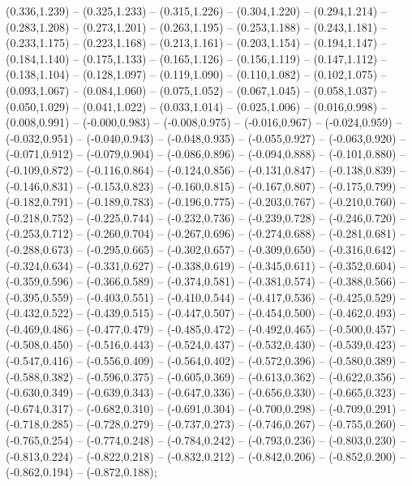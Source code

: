 (0.336,1.239) -- (0.325,1.233) -- (0.315,1.226) -- (0.304,1.220) -- (0.294,1.214) -- (0.283,1.208) -- (0.273,1.201) -- (0.263,1.195) -- (0.253,1.188) -- (0.243,1.181) -- (0.233,1.175) -- (0.223,1.168) -- (0.213,1.161) -- (0.203,1.154) -- (0.194,1.147) -- (0.184,1.140) -- (0.175,1.133) -- (0.165,1.126) -- (0.156,1.119) -- (0.147,1.112) -- (0.138,1.104) -- (0.128,1.097) -- (0.119,1.090) -- (0.110,1.082) -- (0.102,1.075) -- (0.093,1.067) -- (0.084,1.060) -- (0.075,1.052) -- (0.067,1.045) -- (0.058,1.037) -- (0.050,1.029) -- (0.041,1.022) -- (0.033,1.014) -- (0.025,1.006) -- (0.016,0.998) -- (0.008,0.991) -- (-0.000,0.983) -- (-0.008,0.975) -- (-0.016,0.967) -- (-0.024,0.959) -- (-0.032,0.951) -- (-0.040,0.943) -- (-0.048,0.935) -- (-0.055,0.927) -- (-0.063,0.920) -- (-0.071,0.912) -- (-0.079,0.904) -- (-0.086,0.896) -- (-0.094,0.888) -- (-0.101,0.880) -- (-0.109,0.872) -- (-0.116,0.864) -- (-0.124,0.856) -- (-0.131,0.847) -- (-0.138,0.839) -- (-0.146,0.831) -- (-0.153,0.823) -- (-0.160,0.815) -- (-0.167,0.807) -- (-0.175,0.799) -- (-0.182,0.791) -- (-0.189,0.783) -- (-0.196,0.775) -- (-0.203,0.767) -- (-0.210,0.760) -- (-0.218,0.752) -- (-0.225,0.744) -- (-0.232,0.736) -- (-0.239,0.728) -- (-0.246,0.720) -- (-0.253,0.712) -- (-0.260,0.704) -- (-0.267,0.696) -- (-0.274,0.688) -- (-0.281,0.681) -- (-0.288,0.673) -- (-0.295,0.665) -- (-0.302,0.657) -- (-0.309,0.650) -- (-0.316,0.642) -- (-0.324,0.634) -- (-0.331,0.627) -- (-0.338,0.619) -- (-0.345,0.611) -- (-0.352,0.604) -- (-0.359,0.596) -- (-0.366,0.589) -- (-0.374,0.581) -- (-0.381,0.574) -- (-0.388,0.566) -- (-0.395,0.559) -- (-0.403,0.551) -- (-0.410,0.544) -- (-0.417,0.536) -- (-0.425,0.529) -- (-0.432,0.522) -- (-0.439,0.515) -- (-0.447,0.507) -- (-0.454,0.500) -- (-0.462,0.493) -- (-0.469,0.486) -- (-0.477,0.479) -- (-0.485,0.472) -- (-0.492,0.465) -- (-0.500,0.457) -- (-0.508,0.450) -- (-0.516,0.443) -- (-0.524,0.437) -- (-0.532,0.430) -- (-0.539,0.423) -- (-0.547,0.416) -- (-0.556,0.409) -- (-0.564,0.402) -- (-0.572,0.396) -- (-0.580,0.389) -- (-0.588,0.382) -- (-0.596,0.375) -- (-0.605,0.369) -- (-0.613,0.362) -- (-0.622,0.356) -- (-0.630,0.349) -- (-0.639,0.343) -- (-0.647,0.336) -- (-0.656,0.330) -- (-0.665,0.323) -- (-0.674,0.317) -- (-0.682,0.310) -- (-0.691,0.304) -- (-0.700,0.298) -- (-0.709,0.291) -- (-0.718,0.285) -- (-0.728,0.279) -- (-0.737,0.273) -- (-0.746,0.267) -- (-0.755,0.260) -- (-0.765,0.254) -- (-0.774,0.248) -- (-0.784,0.242) -- (-0.793,0.236) -- (-0.803,0.230) -- (-0.813,0.224) -- (-0.822,0.218) -- (-0.832,0.212) -- (-0.842,0.206) -- (-0.852,0.200) -- (-0.862,0.194) -- (-0.872,0.188);
